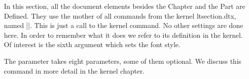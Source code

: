 
\begin{multicols}{2}
In this section, all the document elements besides the Chapter and the Part are Defined. They use the mother of all commands from the kernel
ltsection.dtx, named |\@startsection|. This is just a call to the kernel command. No other settings are done here. In order to remember what it does we refer to its definition in the kernel. Of interest is the sixth argument which sets the font style.

The parameter takes eight parameters, some of them optional. We discuss this command in more detail in the kernel chapter.

\end{multicols}


